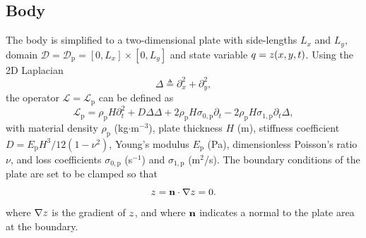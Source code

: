     \subsection{Body}
    The body is simplified to a two-dimensional plate with side-lengths $L_x$ and $L_y$, domain $\mathcal{D} = \mathcal{D}_\text{p} = [0,L_x] \times [0,L_y]$ and state variable $q = z(x,y,t)$. Using the 2D Laplacian
    \begin{equation}\label{eq:laplacian}
        \Delta \triangleq \partial_x^2+\partial_y^2,
    \end{equation}
    the operator $\mathcal{L} = \mathcal{L}_\text{p}$ can be defined as \cite{bilbao2009numerical}
    \begin{equation}
        \mathcal{L}_\text{p} = \rho_\text{p}H\partial_t^2 + D\Delta\Delta +2\rho_\text{p}H\sigma_{0,\text{p}}\partial_t-2\rho_\text{p}H\sigma_{1,\text{p}}\partial_t\Delta,
    \end{equation}
    with material density $\rho_\text{p}$ (kg$\cdot$m$^{-3}$), plate thickness $H$ (m), stiffness coefficient $D = E_\text{p}H^3/12(1-\nu^2)$, Young's modulus $E_\text{p}$ (Pa), dimensionless Poisson's ratio $\nu$, and loss coefficients $\sigma_{0,\text{p}}$ (s$^{-1}$) and $\sigma_{1,\text{p}}$ (m$^2$/s). The boundary conditions of the plate are set to be clamped so that
    \begin{equation}
        z = {\bf n} \cdot \nabla z = 0.
    \end{equation}
    where $\nabla z$ is the gradient of $z$, and where ${\bf n}$ indicates a normal to the plate area at the boundary.
